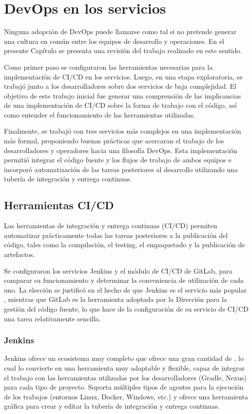 %
%
\chapter{DevOps en los servicios}
%
Ninguna adopción de DevOps puede llamarse como tal si no pretende
generar una cultura en común entre los equipos de desarrollo y
operaciones. En el presente Capítulo se presenta una revisión del
trabajo realizado en este sentido.

Como primer paso se configuraron las herramientas necesarias para la
implementación de CI/CD en los servicios. Luego, en una etapa
exploratoria, se trabajó junto a los desarrolladores sobre dos
servicios de baja complejidad. El objetivo de este trabajo inicial fue
generar una comprensión de las implicancias de una implementación de
CI/CD sobre la forma de trabajo con el código, así como entender el
funcionamiento de las herramientas utilizadas.

Finalmente, se trabajó con tres servicios más complejos en una
implementación más formal, proponiendo buenas prácticas que acercaran
el trabajo de los desarrolladores y operadores hacia una filosofía
DevOps. Esta implementación permitió integrar el código fuente y los
flujos de trabajo de ambos equipos e incorporó automatización de las
tareas posteriores al desarrollo utilizando una tubería de integración
y entrega continuas.
%
%
\section{Herramientas CI/CD}
%
Las herramientas de integración y entrega continuas (CI/CD) permiten
automatizar prácticamente todas las tareas posteriores a la
publicación del código, tales como la compilación, el testing, el
empaquetado y la publicación de artefactos.

Se configuraron los servicios Jenkins y el módulo de CI/CD de GitLab,
para comparar su funcionamiento y determinar la conveniencia de
utilización de cada uno. La elección se justificó en el hecho de que
Jenkins es el servicio más popular \cite{cicdcomparison}, mientras que
GitLab es la herramienta adoptada por la Dirección para la gestión del
código fuente, lo que hace de la configuración de su servicio de CI/CD
una tarea relativamente sencilla.
%
\subsection{Jenkins}
%
Jenkins ofrece un ecosistema muy completo que ofrece una gran cantidad
de , lo cual lo convierte en una herramienta muy
adaptable y flexible, capaz de integrar el trabajo con las
herramientas utilizadas por los desarrolladores (Gradle, Nexus) para
cada tipo de proyecto. Soporta múltiples tipos de agentes para la
ejecución de los trabajos (entornos Linux, Docker, Windows, etc.) y
ofrece una herramienta gráfica para crear y editar la tubería de
integración y entrega continuas.

